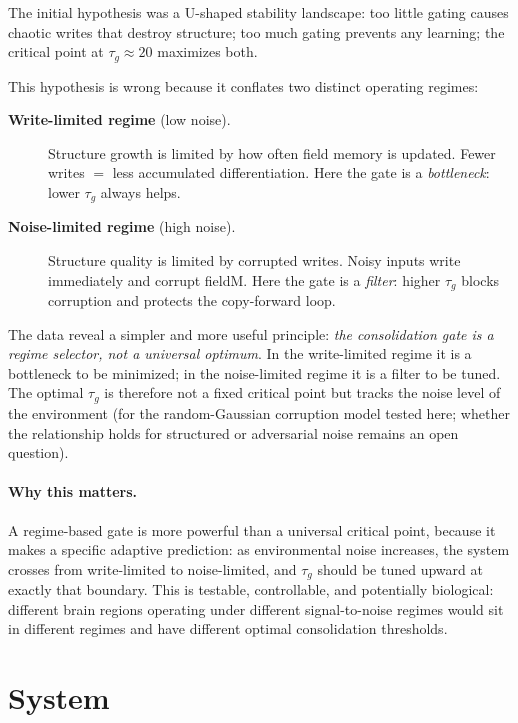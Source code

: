 \documentclass[11pt,twocolumn]{article}
\begin{document}
The initial hypothesis was a U-shaped stability landscape: too little gating
causes chaotic writes that destroy structure; too much gating prevents any
learning; the critical point at $\tau_g \approx 20$ maximizes both.

This hypothesis is wrong because it conflates two distinct operating regimes:

\begin{description}
  \item[\textbf{Write-limited regime} (low noise).] Structure growth is limited
    by how often field memory is updated. Fewer writes $=$ less accumulated
    differentiation. Here the gate is a \emph{bottleneck}: lower $\tau_g$
    always helps.
  \item[\textbf{Noise-limited regime} (high noise).] Structure quality is limited
    by corrupted writes. Noisy inputs write immediately and corrupt fieldM.
    Here the gate is a \emph{filter}: higher $\tau_g$ blocks corruption and
    protects the copy-forward loop.
\end{description}

The data reveal a simpler and more useful principle: \emph{the consolidation gate
is a regime selector, not a universal optimum}. In the write-limited regime it is
a bottleneck to be minimized; in the noise-limited regime it is a filter to be
tuned. The optimal $\tau_g$ is therefore not a fixed critical point but tracks the
noise level of the environment (for the random-Gaussian corruption model tested
here; whether the relationship holds for structured or adversarial noise remains
an open question).

\paragraph{Why this matters.}
A regime-based gate is more powerful than a universal critical point,
because it makes a specific adaptive prediction: as environmental noise increases,
the system crosses from write-limited to noise-limited, and $\tau_g$ should be
tuned upward at exactly that boundary. This is testable, controllable, and
potentially biological: different brain regions operating under different
signal-to-noise regimes would sit in different regimes and have different optimal
consolidation thresholds.

\section{System}
\end{document}
